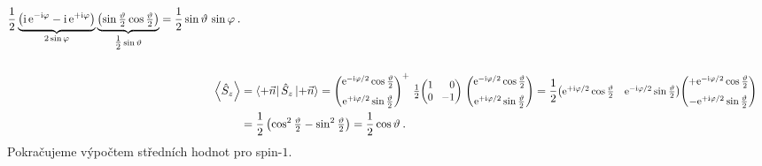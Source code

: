 \documentclass[10pt,a4paper]{article}
\def\ph{\phantom}
\newcommand*{\mask}[2]{%
    \mathord{\makebox[\widthof{\(#1\)}]{\(#2\)}}%
}
\newcommand{\const}[1]{\text{#1}}
\newcommand{\expect}[1]{\left< #1 \right>}
\newcommand{\mat}[1]{
    \begin{pmatrix}
        #1
    \end{pmatrix}
}
\newcommand{\smat}[2][1]{
    \scalebox{#1}{$\mat{#2}$}
}
\newcommand{\bra}[1]{\left< #1 \right|}
\newcommand{\ket}[1]{\left| #1 \right>}
\newcommand{\e}[1]{\const{e}^{#1}}
\renewcommand{\i}{\const{i}}
\def\0{\mask{+}{0}}
\begin{document}
\begin{align*}
    \frac{1}{2}
    \underbrace{
        \left( \i \, \e{-\i \varphi} - \i \, \e{+\i \varphi} \right)
    }_{2 \sin \varphi}
    \underbrace{
        \left( \sin \tfrac{\vartheta}{2} \cos \tfrac{\vartheta}{2} \right)
    }_{\tfrac{1}{2} \sin \vartheta}
    =
    \frac{1}{2}
    \sin \vartheta \,
    \sin \varphi
    \: .
    \\
    \\
    \expect{ \hat S_z }
    &= \bra{+\vec n} \hat S_z \ket{+\vec n}
    = \smat[0.9]{
        \e{-\i \varphi/2} \cos \tfrac{\vartheta}{2}\\[7pt]
        \e{+\i \varphi/2} \sin \tfrac{\vartheta}{2}
    }^+
    \; \tfrac{1}{2} \smat[0.9]{1&\ph{\!-}0\\0&\!-1} \;
    \smat[0.9]{
        \e{-\i \varphi/2} \cos \tfrac{\vartheta}{2}\\[7pt]
        \e{+\i \varphi/2} \sin \tfrac{\vartheta}{2}
    }
    = \frac{1}{2}
    \smat[0.9]{
        \e{+\i \varphi/2} \cos \tfrac{\vartheta}{2} &
        \e{-\i \varphi/2} \sin \tfrac{\vartheta}{2}
    }
    \smat[0.9]{
        +\e{-\i \varphi/2} \cos \tfrac{\vartheta}{2}
        \\[7pt]
        -\e{+\i \varphi/2} \sin \tfrac{\vartheta}{2}
    }
    \\
    &= \frac{1}{2} \left(
        \cos^2 \tfrac{\vartheta}{2}
        - \sin^2 \tfrac{\vartheta}{2}
    \right)
    = \frac{1}{2} \cos \vartheta
    \: .
\end{align*}
Pokračujeme výpočtem středních hodnot pro spin-$1$.
\end{document}
